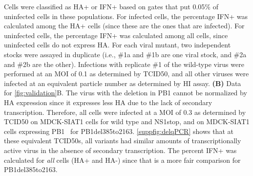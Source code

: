 \documentclass[10pt,letterpaper]{article}
\newcommand{\FIG}[1]{\autoref{fig:#1}}
\newcommand{\SUPPFIG}[1]{\autoref{suppfig:#1}}
\begin{document}
\begin{suppfig}
{Cells were classified as HA+ or IFN+ based on gates that put 0.05\% of uninfected cells in these populations.
For infected cells, the percentage IFN+ was calculated among the HA+ cells (since these are the ones that are infected).
For uninfected cells, the percentage IFN+ was calculated among all cells, since uninfected cells do not express HA.
For each viral mutant, two independent stocks were assayed in duplicate (i.e., \#1a and \#1b are one viral stock, and \#2a and \#2b are the other).
Infections with replicate \#1 of the wild-type virus were performed at an MOI of 0.1 as determined by TCID50, and all other viruses were infected at an equivalent particle number as determined by HI assay. 
{\bf (B)}
Data for \FIG{validation}B.
The virus with the deletion in PB1 cannot be normalized by HA expression since it expresses less HA due to the lack of secondary transcription.
Therefore, all cells were infected at a MOI of 0.3 as determined by TCID50 on MDCK-SIAT1 cells for wild type and NS1stop, and on MDCK-SIAT1 cells expressing PB1~\citep{bloom2010permissive} for PB1del385to2163.
\SUPPFIG{delqPCR} shows that at these equivalent TCID50s, all variants had similar amounts of transcriptionally active virus in the absence of secondary transcription.
The percent IFN+ was calculated for \emph{all} cells (HA+ and HA-) since that is a more fair comparison for PB1del385to2163.
}
\label{suppfig:validationflow}
\end{suppfig}
\end{document}
